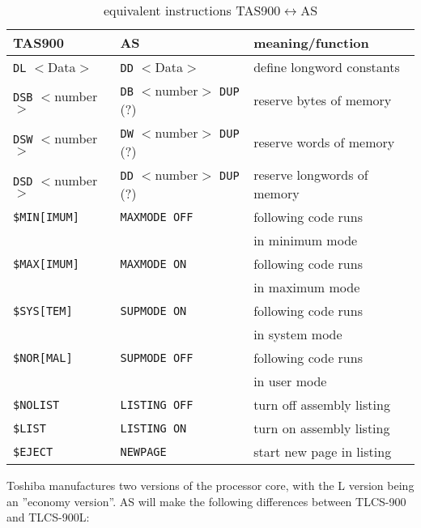 \documentclass[12pt,twoside]{report}
\newcommand{\tty}[1]{{\tt #1}}
\begin{document}
\begin{table*}[htbp]
\begin{center}\begin{tabular}{|l|l|l|}
\hline
TAS900           & AS                  &     meaning/function \\
\hline
\hline
\tty{DL} $<$Data$>$    & \tty{DD} $<$Data$>$           & define longword constants \\
\hline
\tty{DSB} $<$number$>$ & \tty{DB} $<$number$>$ \tty{DUP} (?) & reserve bytes of memory \\
\hline
\tty{DSW} $<$number$>$ & \tty{DW} $<$number$>$ \tty{DUP} (?) & reserve words of memory \\
\hline
\tty{DSD} $<$number$>$ & \tty{DD} $<$number$>$ \tty{DUP} (?) & reserve longwords of memory \\
\hline
\tty{\$MIN[IMUM]}      & \tty{MAXMODE OFF}             & following code runs \\
                       &                               & in minimum mode \\
\hline
\tty{\$MAX[IMUM]}      & \tty{MAXMODE ON}              & following code runs \\
                       &                               & in maximum mode \\
\hline
\tty{\$SYS[TEM]}       & \tty{SUPMODE ON}              & following code runs \\
                       &                               & in system mode \\
\hline
\tty{\$NOR[MAL]}       & \tty{SUPMODE OFF}             & following code runs \\
                       &                               & in user mode \\
\hline
\tty{\$NOLIST}         & \tty{LISTING OFF}             & turn off assembly listing \\
\hline
\tty{\$LIST}           & \tty{LISTING ON}              & turn on assembly listing \\
\hline
\tty{\$EJECT}          & \tty{NEWPAGE}                 & start new page in listing \\
\hline
\end{tabular}\end{center}
\caption{equivalent instructions TAS900$\leftrightarrow$AS\label{TabTAS900}}
\end{table*}
Toshiba manufactures two versions of the processor core, with the L
version being an ''economy version''.  AS will make the following
differences between TLCS-900 and TLCS-900L:
\end{document}
